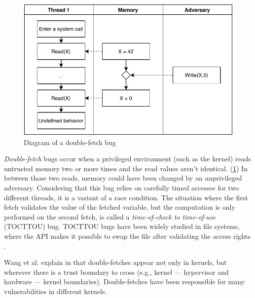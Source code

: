 \begin{figure}[]
  \centering
  \includegraphics[width=.85\linewidth]{img/doublefetch.pdf}
  \caption{Diagram of a double-fetch bug}
  \label{fig:doublefetch}
\end{figure}

\emph{Double-fetch} bugs occur when a privileged environment (such as the
kernel) reads untrusted memory two or more times and the read values aren't
identical. (\cref{fig:doublefetch}) In between those two reads, memory could
have been changed by an unprivileged adversary. Considering that this bug relies
on carefully timed accesses for two different threads, it is a variant of a race
condition. The situation where the first fetch validates the value of the
fetched variable, but the computation is only performed on the second fetch, is
called a \emph{time-of-check to time-of-use} (TOCTTOU) bug. TOCTTOU bugs have
been widely studied in file systems, where the API makes it possible to swap the
file after validating the access rights \cite{payer2012protecting,
pu2006methodical, wei2010modeling, tsafrir2008portably}.

Wang et al. explain in \cite{wang2018survey} that double-fetches appear not only
in kernels, but wherever there is a trust boundary to cross (e.g., kernel ---
hypervisor\cite{wilhelm2016xenpwn} and hardware --- kernel
boundaries\cite{lu2018untrusted}). Double-fetches have been responsible for many
vulnerabilities in different kernels\cite{jurczyk2013bochspwn, wang2018survey}.

